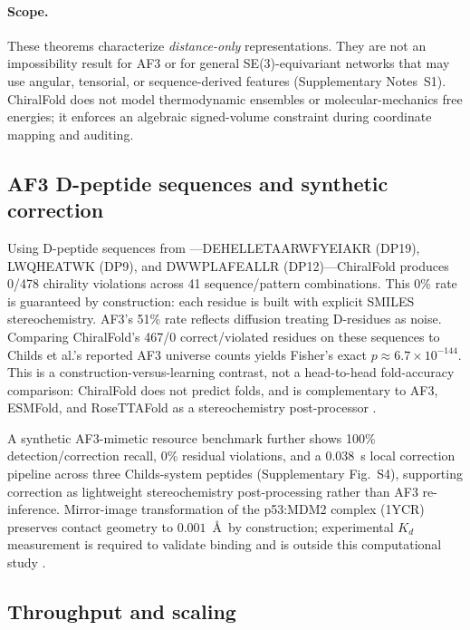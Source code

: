 \documentclass[numsec,webpdf,modern,large,namedate]{oup-authoring-template}
\begin{document}
\paragraph{Scope.}
These theorems characterize \emph{distance-only} representations. They are not an impossibility result for AF3 \citep{abramson2024} or for general SE(3)-equivariant networks that may use angular, tensorial, or sequence-derived features (Supplementary Notes~S1). ChiralFold does not model thermodynamic ensembles or molecular-mechanics free energies; it enforces an algebraic signed-volume constraint during coordinate mapping and auditing.

\subsection{AF3 D-peptide sequences and synthetic correction}

Using D-peptide sequences from \citet{childs2025}---DEHELLETAARWFYEIAKR (DP19), LWQHEATWK (DP9), and DWWPLAFEALLR (DP12)---ChiralFold produces 0/478 chirality violations across 41 sequence/pattern combinations. This 0\% rate is guaranteed by construction: each residue is built with explicit SMILES stereochemistry. AF3's 51\% rate reflects diffusion treating D-residues as noise. Comparing ChiralFold's 467/0 correct/violated residues on these sequences to Childs et al.'s reported AF3 universe counts yields Fisher's exact $p\approx6.7\times10^{-144}$. This is a construction-versus-learning contrast, not a head-to-head fold-accuracy comparison: ChiralFold does not predict folds, and is complementary to AF3, ESMFold, and RoseTTAFold as a stereochemistry post-processor \citep{abramson2024,lin2023,baek2021}.

A synthetic AF3-mimetic resource benchmark further shows 100\% detection/correction recall, 0\% residual violations, and a 0.038~s local correction pipeline across three Childs-system peptides (Supplementary Fig.~S4), supporting correction as lightweight stereochemistry post-processing rather than AF3 re-inference. Mirror-image transformation of the p53:MDM2 complex (1YCR) preserves contact geometry to $0.001$~\AA\ by construction; experimental $K_d$ measurement is required to validate binding and is outside this computational study \citep{liu2010}.

\subsection{Throughput and scaling}
\label{sec:performance}
\end{document}
